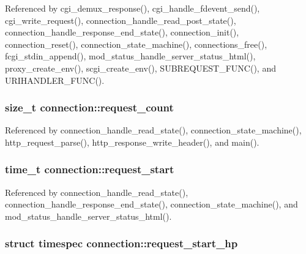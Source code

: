 Referenced by cgi\-\_\-demux\-\_\-response(), cgi\-\_\-handle\-\_\-fdevent\-\_\-send(), cgi\-\_\-write\-\_\-request(), connection\-\_\-handle\-\_\-read\-\_\-post\-\_\-state(), connection\-\_\-handle\-\_\-response\-\_\-end\-\_\-state(), connection\-\_\-init(), connection\-\_\-reset(), connection\-\_\-state\-\_\-machine(), connections\-\_\-free(), fcgi\-\_\-stdin\-\_\-append(), mod\-\_\-status\-\_\-handle\-\_\-server\-\_\-status\-\_\-html(), proxy\-\_\-create\-\_\-env(), scgi\-\_\-create\-\_\-env(), S\-U\-B\-R\-E\-Q\-U\-E\-S\-T\-\_\-\-F\-U\-N\-C(), and U\-R\-I\-H\-A\-N\-D\-L\-E\-R\-\_\-\-F\-U\-N\-C().

\hypertarget{structconnection_a7607ed0216aca45cbc4d20b83b2b5102}{
\subsubsection[{request\-\_\-count}]{\setlength{\rightskip}{0pt plus 5cm}size\-\_\-t connection\-::request\-\_\-count}}\label{structconnection_a7607ed0216aca45cbc4d20b83b2b5102}


Referenced by connection\-\_\-handle\-\_\-read\-\_\-state(), connection\-\_\-state\-\_\-machine(), http\-\_\-request\-\_\-parse(), http\-\_\-response\-\_\-write\-\_\-header(), and main().

\hypertarget{structconnection_a35ab49ce195e54eb674b504a5b82aa72}{
\subsubsection[{request\-\_\-start}]{\setlength{\rightskip}{0pt plus 5cm}time\-\_\-t connection\-::request\-\_\-start}}\label{structconnection_a35ab49ce195e54eb674b504a5b82aa72}


Referenced by connection\-\_\-handle\-\_\-read\-\_\-state(), connection\-\_\-handle\-\_\-response\-\_\-end\-\_\-state(), connection\-\_\-state\-\_\-machine(), and mod\-\_\-status\-\_\-handle\-\_\-server\-\_\-status\-\_\-html().

\hypertarget{structconnection_afffa8ceb142ef540be58e430107c1601}{
\subsubsection[{request\-\_\-start\-\_\-hp}]{\setlength{\rightskip}{0pt plus 5cm}struct timespec connection\-::request\-\_\-start\-\_\-hp}}\label{structconnection_afffa8ceb142ef540be58e430107c1601}


